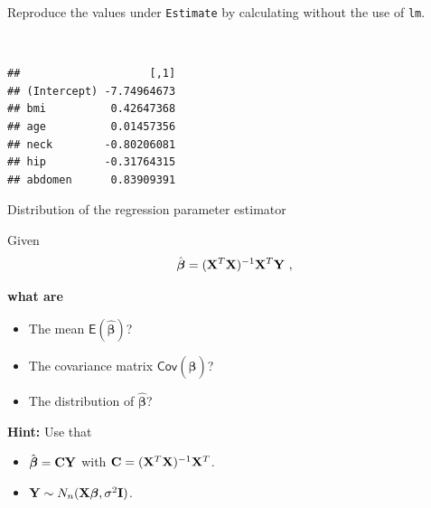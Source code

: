 \documentclass[
  10pt,
  ignorenonframetext,
]{beamer}
\newenvironment{Shaded}{\begin{snugshade}}{\end{snugshade}}
\newcommand{\FunctionTok}[1]{\textcolor[rgb]{0.13,0.29,0.53}{\textbf{#1}}}
\newcommand{\NormalTok}[1]{#1}
\newcommand{\OtherTok}[1]{\textcolor[rgb]{0.56,0.35,0.01}{#1}}
\newcommand{\SpecialCharTok}[1]{\textcolor[rgb]{0.81,0.36,0.00}{\textbf{#1}}}
\providecommand{\tightlist}{%
  \setlength{\itemsep}{0pt}\setlength{\parskip}{0pt}}
\begin{document}
\begin{frame}[fragile]
Reproduce the values under \texttt{Estimate} by calculating without the
use of \texttt{lm}.

\(~\)

\scriptsize

\begin{Shaded}
\end{Shaded}

\begin{verbatim}
##                    [,1]
## (Intercept) -7.74964673
## bmi          0.42647368
## age          0.01457356
## neck        -0.80206081
## hip         -0.31764315
## abdomen      0.83909391
\end{verbatim}
\end{frame}

\begin{frame}
\begin{block}{Distribution of the regression parameter estimator}
\protect\hypertarget{distribution-of-the-regression-parameter-estimator}{}
\vspace{2mm}

Given
\[ \hat{\boldsymbol\beta}=({\bf X}^T{\bf X})^{-1} {\bf X}^T {\bf Y} \ ,\]

\textbf{what are}

\begin{itemize}
\tightlist
\item
  The mean \(\mathsf{E}(\hat{\boldsymbol\beta})\)?
\item
  The covariance matrix \(\mathsf{Cov}(\hat{\boldsymbol\beta})\)?
\item
  The distribution of \(\hat{\boldsymbol\beta}\)?
\end{itemize}

\vspace{4mm}

\textbf{Hint:} Use that

\begin{itemize}
\tightlist
\item
  \(\hat{\boldsymbol\beta}={\bf C}{\bf Y}\) with
  \({\bf C}=({\bf X}^T{\bf X})^{-1} {\bf X}^T\).
\item
  \({\bf Y} \sim N_{n}({\bf X} {\boldsymbol\beta},\sigma^2 {\bf I})\).
\end{itemize}
\end{block}
\end{frame}
\end{document}
